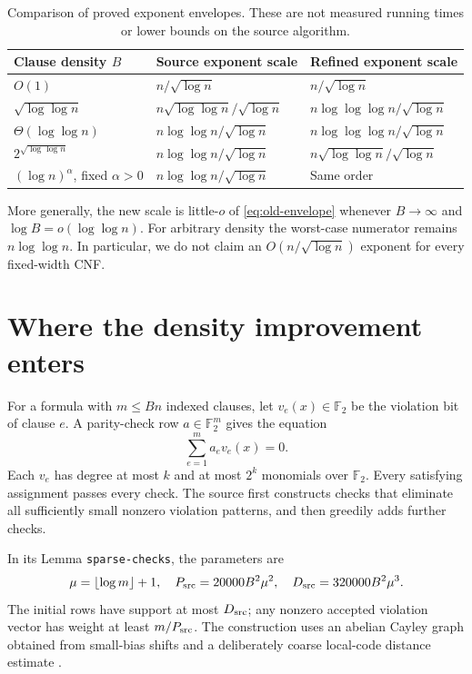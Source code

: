 \documentclass[11pt]{article}
\theoremstyle{remark}
\newcommand{\F}{\mathbb F}
\newcommand{\floor}[1]{\left\lfloor #1\right\rfloor}
\begin{document}
\begin{table}[ht]
\centering
\small
\begin{tabular}{@{}p{}p{}p{}@{}}
\toprule
Clause density \(B\) & Source exponent scale & Refined exponent scale\\
\midrule
\(O(1)\) &
\(n/\sqrt{\log n}\) &
\(n/\sqrt{\log n}\)\\[5pt]
\(\sqrt{\log\log n}\) &
\(n\sqrt{\log\log n}/\sqrt{\log n}\) &
\(n\log\log\log n/\sqrt{\log n}\)\\[5pt]
\(\Theta(\log\log n)\) &
\(n\log\log n/\sqrt{\log n}\) &
\(n\log\log\log n/\sqrt{\log n}\)\\[5pt]
\(2^{\sqrt{\log\log n}}\) &
\(n\log\log n/\sqrt{\log n}\) &
\(n\sqrt{\log\log n}/\sqrt{\log n}\)\\[5pt]
\((\log n)^\alpha\), fixed \(\alpha>0\) &
\(n\log\log n/\sqrt{\log n}\) &
Same order\\
\bottomrule
\end{tabular}
\caption{Comparison of proved exponent envelopes. These are not measured
running times or lower bounds on the source algorithm.}\label{tab:comparison}
\end{table}

More generally, the new scale is little-\(o\) of
\eqref{eq:old-envelope} whenever \(B\to\infty\) and
\(\log B=o(\log\log n)\). For arbitrary density the worst-case
numerator remains \(n\log\log n\). In particular, we do not claim
an \(O(n/\sqrt{\log n})\) exponent for every fixed-width CNF.

\section{Where the density improvement enters}\label{sec:mechanism}
For a formula with \(m\le Bn\) indexed clauses, let \(v_e(x)\in\F_2\)
be the violation bit of clause \(e\). A parity-check row \(a\in\F_2^m\)
gives the equation
\[
 \sum_{e=1}^m a_e v_e(x)=0.
\]
Each \(v_e\) has degree at most \(k\) and at most \(2^k\) monomials
over \(\F_2\). Every satisfying assignment passes every check.
The source first constructs checks that eliminate all sufficiently small
nonzero violation patterns, and then greedily adds further checks.

In its Lemma \texttt{sparse-checks}, the parameters are
\[
 \mu=\floor{\log m}+1,\quad
 P_{\rm src}=20000 B^2\mu^2,\quad
 D_{\rm src}=320000 B^2\mu^3.
\]
The initial rows have support at most \(D_{\rm src}\); any nonzero
accepted violation vector has weight at least \(m/P_{\rm src}\).
The construction uses an abelian Cayley graph obtained from small-bias
shifts and a deliberately coarse local-code distance estimate
\cite{OAI26}.
\end{document}
